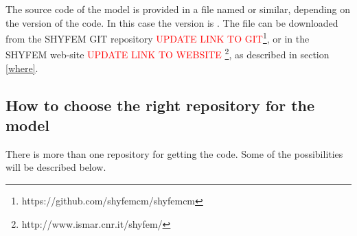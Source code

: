 
%
%
%
%
%
%
%

The source code of the model is provided in a file named \ttt{\shydist}
or similar, depending on the version of the code. In this case the
version is \version.  The file can be downloaded from the SHYFEM GIT
repository \textcolor{red}{UPDATE LINK TO GIT}\footnote{ https://github.com/shyfemcm/shyfemcm}, or
 in the SHYFEM web-site \textcolor{red}{UPDATE LINK TO WEBSITE} \footnote{http://www.ismar.cnr.it/shyfem/}, as 
described in section \ref{where}.

\subsection{How to choose the right repository for the model}

There is more than one repository for getting the code. Some of the possibilities will be described below.

